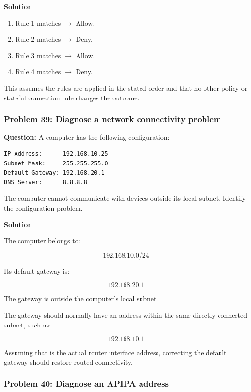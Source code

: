 \textbf{Solution}

\begin{enumerate}
\item Rule 1 matches $\to$ Allow.
\item Rule 2 matches $\to$ Deny.
\item Rule 3 matches $\to$ Allow.
\item Rule 4 matches $\to$ Deny.
\end{enumerate}

This assumes the rules are applied in the stated order and that no other policy or stateful connection rule changes the outcome.

\subsubsection*{Problem 39: Diagnose a network connectivity problem}

\textbf{Question:} A computer has the following configuration:

\begin{lstlisting}
IP Address:      192.168.10.25
Subnet Mask:     255.255.255.0
Default Gateway: 192.168.20.1
DNS Server:      8.8.8.8
\end{lstlisting}

The computer cannot communicate with devices outside its local subnet. Identify the configuration problem.

\textbf{Solution}

The computer belongs to:



\[
192.168.10.0/24
\]



Its default gateway is:



\[
192.168.20.1
\]



The gateway is outside the computer's local subnet.

The gateway should normally have an address within the same directly connected subnet, such as:



\[
\boxed{192.168.10.1}
\]



Assuming that is the actual router interface address, correcting the default gateway should restore routed connectivity.

\subsubsection*{Problem 40: Diagnose an APIPA address}


